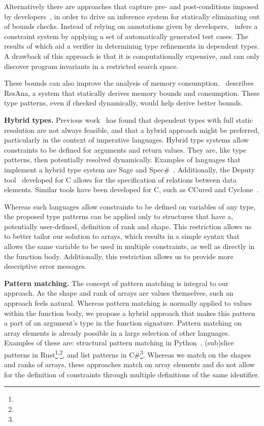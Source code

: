 Alternatively there are approaches that capture pre- and post-conditions imposed by developers~\cite{bounds-specializer}, in order to drive an inference system for statically eliminating out of bounds checks.
Instead of relying on annotations given by developers,~\cite{dependent-from-tests} infers a constraint system by applying a set of automatically generated test cases.
The results of which aid a verifier in determining type refinements in dependent types.
A drawback of this approach is that it is computationally expensive, and can only discover program invariants in a restricted search space.

These bounds can also improve the analysis of memory consumption.~\cite{DBLP:conf/fopara/GastelKE15} describes ResAna, a system that statically derives memory bounds and consumption. These type patterns, even if checked dynamically, would help derive better bounds.

\textbf{Hybrid types.}
Previous work~\cite{hybrid-type-checking, dynamic-dependent-types} has found that dependent types with full static resolution are not always feasible, and that a hybrid approach might be preferred, particularly in the context of imperative languages.
Hybrid type systems allow constraints to be defined for arguments and return values.
They are, like type patterns, then potentially resolved dynamically.
Examples of languages that implement a hybrid type system are Sage and Spec\#~\cite{sage, specsharp}.
Additionally, the Deputy tool~\cite{deputy, deputy-2} developed for C allows for the specification of relations between data elements.
Similar tools have been developed for C, such as CCured and Cyclone~\cite{ccured, cyclone}.

Whereas such languages allow constraints to be defined on variables of any type, the proposed type patterns can be applied only to structures that have a, potentially user-defined, definition of rank and shape.
This restriction allows us to better tailor our solution to arrays, which results in a simple syntax that allows the same variable to be used in multiple constraints, as well as directly in the function body.
Additionally, this restriction allows us to provide more descriptive error messages.

\textbf{Pattern matching.}
The concept of pattern matching is integral to our approach.
As the shape and rank of arrays are values themselves, such an approach feels natural.
Whereas pattern matching is normally applied to values within the function body, we propose a hybrid approach that makes this pattern a part of an argument's type in the function signature.
Pattern matching on array elements is already possible in a large selection of other languages.
Examples of these are: structural pattern matching in Python~\cite{pattern-matching-python}, (sub)slice patterns in Rust\footnote{\slicepatterns}\textsuperscript{,}\footnote{\subslicepatterns}, and list patterns in C\#\footnote{\listpatterns}.
Whereas we match on the shapes and ranks of arrays, these approaches match on array elements and do
not allow for the definition of constraints through multiple definitions of the same identifier.

